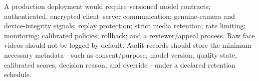 A production deployment would require versioned model contracts; authenticated,
encrypted client--server communication; genuine-camera and device-integrity
signals; replay protection; strict media retention; rate limiting; monitoring;
calibrated policies; rollback; and a reviewer/appeal process. Raw face videos
should not be logged by default. Audit records should store the minimum necessary
metadata---such as consent/purpose, model version, quality state, calibrated
scores, decision reason, and override---under a declared retention schedule.
